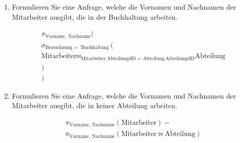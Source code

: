 \documentclass{bschlangaul-aufgabe}
\begin{document}
\begin{enumerate}






\item Formulieren Sie eine Anfrage, welche die Vornamen und Nachnamen
der Mitarbeiter ausgibt, die in der Buchhaltung arbeiten.

\begin{bAntwort}
\begin{multline*}
\pi_{\text{Vorname, Nachname}}(\\
  \sigma_{\text{Bezeichnung = 'Buchhaltung'}}(\\
    \text{Mitarbeiter}
    \bowtie_{\text{Mitarbeiter.AbteilungsID = Abteilung.AbteilungsID}}
    \text{Abteilung}\\
  )\\
)
\end{multline*}
\end{bAntwort}


\item Formulieren Sie eine Anfrage, welche die Vornamen und Nachnamen
der Mitarbeiter ausgibt, die in keiner Abteilung arbeiten.


\begin{bAntwort}
\begin{multline*}
\pi_{\text{Vorname, Nachname}}(\text{Mitarbeiter})
-\\
\pi_{\text{Vorname, Nachname}}(\text{Mitarbeiter} \bowtie \text{Abteilung})
\end{multline*}
\end{bAntwort}
\end{enumerate}
\end{document}
